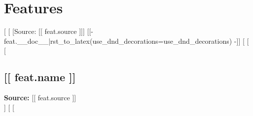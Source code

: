 \section*{Features}
[%
  [%
    [Source: [[ feat.source ]]]
    [[- feat.__doc__|rst_to_latex(use_dnd_decorations=use_dnd_decorations) -]]
  [%
[%
  [%
    \subsection*{[[ feat.name ]]}
    \textbf{Source:} [[ feat.source ]] \\
    [%
      \textbf{**Not included in stats on Character Sheet}
    [%
    [[- feat.__doc__|rst_to_latex -]]
  [%
[%
